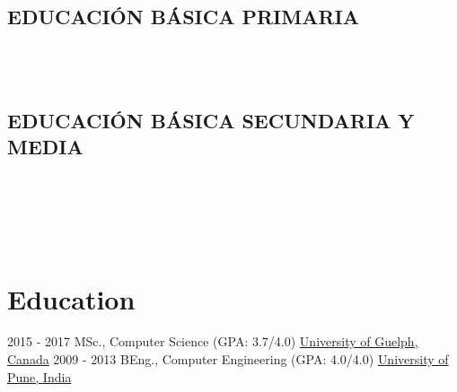\documentclass[letterpaper]{twentysecondcv} %
\begin{document}
\subsection{EDUCACIÓN BÁSICA PRIMARIA}
\begin{center}
    \\
         \\
\end{center}

\subsection{EDUCACIÓN BÁSICA SECUNDARIA Y MEDIA}
\begin{center}
    \\
    \\
    \\
         \\
\end{center}
\newpage
\makeprofile %

\section{Education}

\begin{twenty} %
	\twentyitem
    	{2015 - 2017}
        {}
        {MSc., Computer Science \textnormal{(GPA: 3.7/4.0)}}
        {\href{http://www.uoguelph.ca/}{University of Guelph, Canada}}
        {}
        {}
	\twentyitem
    	{2009 - 2013}
		{}
        {BEng., Computer Engineering \textnormal{(GPA: 4.0/4.0)}}
        {\href{http://www.unipune.ac.in/}{University of Pune, India}}
        {}
        {}
\end{twenty}
\end{document}
